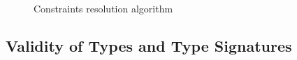 \begin{figure}
\footnotesize
\centering
\begin{minipage}{.7\linewidth}
\begin{algorithm}[H]

    \SolveCtrs{$(\AEnv;\,\EmptyEnv;\,\CSet)$}{
        \KwRet{$\emptysubst$}
    }
    \BlankLine
\end{algorithm}  
\end{minipage}
\caption{Constraints resolution algorithm \solvectrdflt}\label{fig:ctr-solve}      
\end{figure}

\subsection{Validity of Types and Type Signatures}

